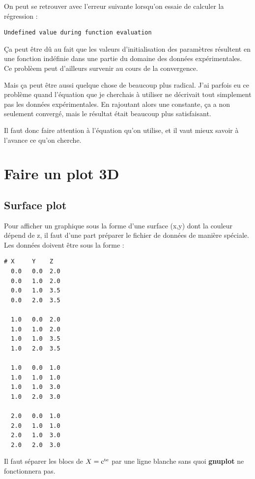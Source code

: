 \documentclass[a4paper,twoside]{article}
\begin{document}
\begin{attention}
On peut se retrouver avec l'erreur suivante lorsqu'on essaie de calculer la régression :
\begin{verbatim}
Undefined value during function evaluation
\end{verbatim}

Ça peut être dû au fait que les valeurs d'initialisation des paramètres résultent en une fonction indéfinie dans une partie du domaine des données expérimentales. Ce problèem peut d'ailleurs survenir au cours de la convergence. 

Mais ça peut être aussi quelque chose de beaucoup plus radical. J'ai parfois eu ce problème quand l'équation que je cherchais à utiliser ne décrivait tout simplement pas les données expérimentales. En rajoutant alors une constante, ça a non seulement convergé, mais le résultat était beaucoup plus satisfaisant. 

Il faut donc faire attention à l'équation qu'on utilise, et il vaut mieux savoir à l'avance ce qu'on cherche.
\end{attention}




\section{Faire un plot 3D}
\subsection{Surface plot}
Pour afficher un graphique sous la forme d'une surface (x,y) dont la couleur dépend de z, il faut d'une part préparer le fichier de données de manière spéciale. Les données doivent être sous la forme : 
\begin{verbatim}
# X     Y    Z
  0.0   0.0  2.0
  0.0   1.0  2.0
  0.0   1.0  3.5
  0.0   2.0  3.5

  1.0   0.0  2.0
  1.0   1.0  2.0
  1.0   1.0  3.5
  1.0   2.0  3.5

  1.0   0.0  1.0
  1.0   1.0  1.0
  1.0   1.0  3.0
  1.0   2.0  3.0

  2.0   0.0  1.0
  2.0   1.0  1.0
  2.0   1.0  3.0
  2.0   2.0  3.0
\end{verbatim}

\begin{attention}
Il faut séparer les blocs de $X=\mathrm{c^{te}}$ par une ligne blanche sans quoi \textbf{gnuplot} ne fonctionnera pas.
\end{attention}
\end{document}

